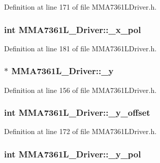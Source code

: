 \-Definition at line 171 of file \-M\-M\-A7361\-L\-Driver.\-h.

\hypertarget{class_m_m_a7361_l___driver_a92df95d740835749c45fb307117bef0b}{
\subsubsection[{\-\_\-x\-\_\-pol}]{\setlength{\rightskip}{0pt plus 5cm}int {\bf \-M\-M\-A7361\-L\-\_\-\-Driver\-::\-\_\-x\-\_\-pol}}}\label{class_m_m_a7361_l___driver_a92df95d740835749c45fb307117bef0b}


\-Definition at line 181 of file \-M\-M\-A7361\-L\-Driver.\-h.

\hypertarget{class_m_m_a7361_l___driver_a6587677449e1325bb3d0b29bc1b3ec9c}{
\subsubsection[{\-\_\-y}]{$\ast$ {\bf \-M\-M\-A7361\-L\-\_\-\-Driver\-::\-\_\-y}}}\label{class_m_m_a7361_l___driver_a6587677449e1325bb3d0b29bc1b3ec9c}


\-Definition at line 156 of file \-M\-M\-A7361\-L\-Driver.\-h.

\hypertarget{class_m_m_a7361_l___driver_a23bd5e2ceee3d3de818765d7c0324593}{
\subsubsection[{\-\_\-y\-\_\-offset}]{\setlength{\rightskip}{0pt plus 5cm}int {\bf \-M\-M\-A7361\-L\-\_\-\-Driver\-::\-\_\-y\-\_\-offset}}}\label{class_m_m_a7361_l___driver_a23bd5e2ceee3d3de818765d7c0324593}


\-Definition at line 172 of file \-M\-M\-A7361\-L\-Driver.\-h.

\hypertarget{class_m_m_a7361_l___driver_a482e90f06c8c0366f375c71a98d8cd63}{
\subsubsection[{\-\_\-y\-\_\-pol}]{\setlength{\rightskip}{0pt plus 5cm}int {\bf \-M\-M\-A7361\-L\-\_\-\-Driver\-::\-\_\-y\-\_\-pol}}}\label{class_m_m_a7361_l___driver_a482e90f06c8c0366f375c71a98d8cd63}


